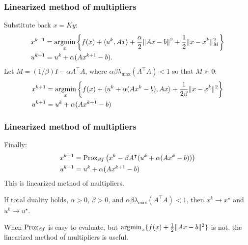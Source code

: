 \documentclass[10pt,mathserif]{beamer}
\begin{document}
\begin{frame}
\frametitle{Linearized method of multipliers}

Substitute back $x=Ky$:
\begin{align*}
x^{k+1} &= \operatorname*{argmin}_x \left\{
f(x)+\langle  u ^k,Ax\rangle+\frac{\alpha}{2}\|Ax-b\|^2
+\frac{1}{2}\|x-x^k\|^2_M\right\}\\
 u ^{k+1} &=  u ^k+\alpha (Ax^{k+1}-b).
\end{align*}
Let $M = (1/\beta) I - \alpha A^\intercal A$,
where $\alpha\beta\lambda_\mathrm{max}(A^\intercal A)<1$ so that $M\succ 0$:
\begin{align*}
x^{k+1} &= \operatorname*{argmin}_x \left\{
f(x)+\langle  u ^k+\alpha(Ax^k-b),Ax\rangle
+\frac{1}{2\beta}\|x-x^k\|^2\right\}\\
 u ^{k+1} &=  u ^k+\alpha (Ax^{k+1}-b)
\end{align*}

\end{frame}



\begin{frame}
\frametitle{Linearized method of multipliers}
Finally:
\begin{align*}
x^{k+1} &= \mathrm{Prox}_{\beta f}\left(x^k-\beta A^\intercal( u ^k+\alpha(Ax^k-b))\right)\\
 u ^{k+1} &=  u ^k+\alpha (Ax^{k+1}-b)
\end{align*}
This is linearized method of multipliers.
\vspace{0.2in}

If total duality holds, $\alpha>0$, $\beta>0$, and $\alpha\beta\lambda_\mathrm{max}(A^\intercal A)<1$,
then $x^k\rightarrow x^\star$ and $ u ^k\rightarrow  u ^\star$.

\vspace{0.2in}
When $\mathrm{Prox}_{\beta f}$ is easy to evaluate,
but %
$\operatorname*{argmin}_x\{f(x)+\frac{1}{2}\|Ax-b\|^2\}$
is not, the linearized method of multipliers is useful.
\end{frame}
\end{document}
